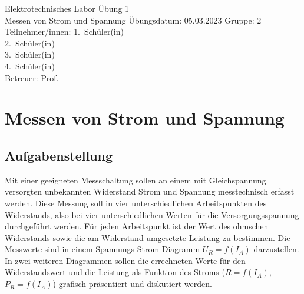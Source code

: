 \documentclass[12pt,a4paper,ngerman]{article}
\begin{document}


\HTLheader                         				%
{Elektrotechnisches Labor}							%
{Übung 1 \\ Messen von Strom und Spannung}   	%
{Übungsdatum: 05.03.2023}                      	%
{Gruppe: 2}                            			%
{Teilnehmer/innen:}								%
{												%
1.~Schüler(in)\\								%
2.~Schüler(in)\\                    
3.~Schüler(in)\\                    
4.~Schüler(in)\\
}
{Betreuer: Prof. }                      		%

%
\tableofcontents            %
\clearpage
%
\section{Messen von Strom und Spannung }

\subsection{Aufgabenstellung}
Mit einer geeigneten Messschaltung sollen an einem mit Gleichspannung versorgten unbekannten Widerstand Strom und Spannung messtechnisch erfasst werden. Diese Messung soll in vier unterschiedlichen Arbeitspunkten des Widerstands, also bei vier unterschiedlichen Werten für die Versorgungsspannung durchgeführt werden. Für jeden Arbeitspunkt ist der Wert des ohmschen Widerstands sowie die am Widerstand umgesetzte Leistung zu bestimmen.
Die Messwerte sind in einem Spannungs-Strom-Diagramm $U_R=f(I_A)$ darzustellen. In zwei weiteren Diagrammen sollen die errechneten Werte für den Widerstandswert und die Leistung als Funktion des Stroms ($R=f(I_A)$,
$P_R=f(I_A)$) grafisch präsentiert und diskutiert werden. 
\end{document}
